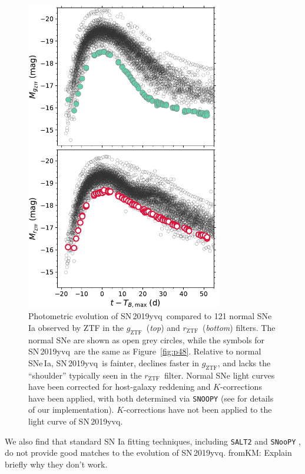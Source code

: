 \documentclass[twocolumn]{aastex63}
\newcommand{\fromkate}[1]{{\color{brown} fromKM: {#1}}}
\newcommand{\rztf}{$r_\mathrm{ZTF}$}
\newcommand{\gztf}{$g_\mathrm{ZTF}$}
\newcommand{\sn}{SN\,2019yvq}
\begin{document}
\begin{figure}
    \centering
    \includegraphics[width=3.35in]{./figures/abs_mag_host_ebv_kcorr.pdf}
    \caption{Photometric evolution of \sn\ compared to 121 normal SNe\,Ia
    observed by ZTF \citep{Yao19} in the \gztf\ (\textit{top}) and \rztf\
    (\textit{bottom}) filters. The normal SNe are shown as open grey circles,
    while the symbols for \sn\ are the same as Figure~\ref{fig:p48}. Relative
    to normal SNe\,Ia, \sn\ is fainter, declines faster in \gztf, and lacks
    the ``shoulder'' typically seen in the \rztf\ filter. Normal SNe light
    curves have been corrected for host-galaxy reddening and $K$-corrections
    have been applied, with both determined via \texttt{SNOOPY} (see
    \citealt{Bulla20} for details of our implementation). $K$-corrections have
    not been applied to the light curve of \sn.}
    \label{fig:lc_comp}
\end{figure}


We also find that standard SN Ia fitting techniques,
including \texttt{SALT2} \citep{Guy07} and \texttt{SNooPY} \citep{Burns11}, do
not provide good matches to the evolution of \sn. \fromkate{Explain briefly
why they don't work.}
\end{document}
